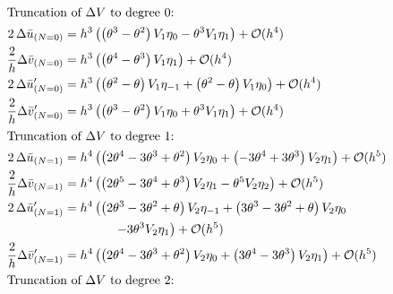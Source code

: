 \begin{align*}
    \intertext{Truncation of $\Delta V$ to degree $0$:}
    2\,\Delta \bar{u}_{(N=0)}          & = h^{3}\left(\left(\theta^{3} - \theta^{2}\right) V_{1} \eta_{0} -\theta^{3} V_{1} \eta_{1}\right) + \mathcal{O}(h^{4})                                                                  \\
    \frac{2}{h}\Delta \bar{v}_{(N=0)}  & = h^{3}\left(\left(\theta^{4} - \theta^{3}\right) V_{1} \eta_{1}\right) + \mathcal{O}(h^{4})                                                                                             \\
    2\,\Delta \bar{u}'_{(N=0)}         & = h^{3}\left(\left(\theta^{2} - \theta\right) V_{1} \eta_{-1} + \left(\theta^{2} - \theta\right) V_{1} \eta_{0}\right) + \mathcal{O}(h^{4})                                              \\
    \frac{2}{h}\Delta \bar{v}'_{(N=0)} & = h^{3}\left(\left(\theta^{3} - \theta^{2}\right) V_{1} \eta_{0} + \theta^{3} V_{1} \eta_{1}\right) + \mathcal{O}(h^{4})                                                                 \\
    \intertext{Truncation of $\Delta V$ to degree $1$:}
    2\,\Delta \bar{u}_{(N=1)}          & = h^{4}\left(\left(2 \theta^{4} - 3 \theta^{3} + \theta^{2}\right) V_{2} \eta_{0} + \left(-3 \theta^{4} + 3 \theta^{3}\right) V_{2} \eta_{1}\right) + \mathcal{O}(h^{5})                 \\
    \frac{2}{h}\Delta \bar{v}_{(N=1)}  & = h^{4}\left(\left(2 \theta^{5} - 3 \theta^{4} + \theta^{3}\right) V_{2} \eta_{1} - \theta^{5} V_{2} \eta_{2}\right) + \mathcal{O}(h^{5})                                                \\
    2\,\Delta \bar{u}'_{(N=1)}         & = h^{4}\left(\left(2 \theta^{3} - 3 \theta^{2} + \theta\right) V_{2} \eta_{-1} + \left(3 \theta^{3} - 3 \theta^{2} + \theta\right) V_{2} \eta_{0} \right.                                \\
                                       & \qquad\qquad \left. - 3 \theta^{3} V_{2} \eta_{1}\right) + \mathcal{O}(h^{5})                                                                                                            \\
    \frac{2}{h}\Delta \bar{v}'_{(N=1)} & = h^{4}\left(\left(2 \theta^{4} - 3 \theta^{3} + \theta^{2}\right) V_{2} \eta_{0} + \left(3 \theta^{4} - 3 \theta^{3}\right) V_{2} \eta_{1}\right) + \mathcal{O}(h^{5})                  \\
    \intertext{Truncation of $\Delta V$ to degree $2$:}

\end{align*}
